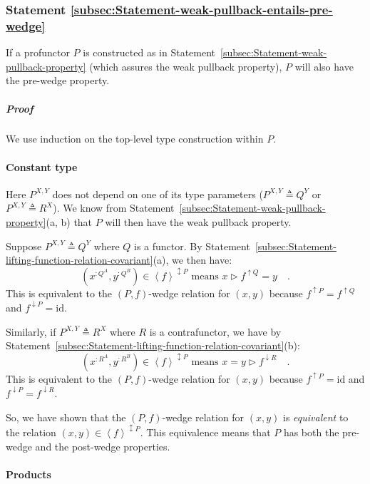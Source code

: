 \subsubsection{Statement \label{subsec:Statement-weak-pullback-entails-pre-wedge}\ref{subsec:Statement-weak-pullback-entails-pre-wedge}}

If a profunctor $P$ is constructed as in Statement~\ref{subsec:Statement-weak-pullback-property}
(which assures the weak pullback property), $P$ will also have the
pre-wedge property.

\subparagraph{Proof}

We use induction on the top-level type construction within $P$.

\paragraph{Constant type}

Here $P^{X,Y}$ does not depend on one of its type parameters ($P^{X,Y}\triangleq Q^{Y}$
or $P^{X,Y}\triangleq R^{X}$). We know from Statement~\ref{subsec:Statement-weak-pullback-property}(a,
b) that $P$ will then have the weak pullback property.

Suppose $P^{X,Y}\triangleq Q^{Y}$ where $Q$ is a functor. By Statement~\ref{subsec:Statement-lifting-function-relation-covariant}(a),
we then have:
\[
(x^{:Q^{A}},y^{:Q^{B}})\in\left<f\right>^{\updownarrow P}\text{ means }x\triangleright f^{\uparrow Q}=y\quad.
\]
This is equivalent to the $\left(P,f\right)$-wedge relation for $(x,y)$
because $f^{\uparrow P}=f^{\uparrow Q}$ and $f^{\downarrow P}=\text{id}$.

Similarly, if $P^{X,Y}\triangleq R^{X}$ where $R$ is a contrafunctor,
we have by Statement~\ref{subsec:Statement-lifting-function-relation-covariant}(b):
\[
(x^{:R^{A}},y^{:R^{B}})\in\left<f\right>^{\updownarrow P}\text{ means }x=y\triangleright f^{\downarrow R}\quad.
\]
This is equivalent to the $\left(P,f\right)$-wedge relation for $(x,y)$
because $f^{\uparrow P}=\text{id}$ and $f^{\downarrow P}=f^{\downarrow R}$.

So, we have shown that the $\left(P,f\right)$-wedge relation for
$(x,y)$ is \emph{equivalent} to the relation $(x,y)\in\left<f\right>^{\updownarrow P}$.
This equivalence means that $P$ has both the pre-wedge and the post-wedge
properties.

\paragraph{Products}

